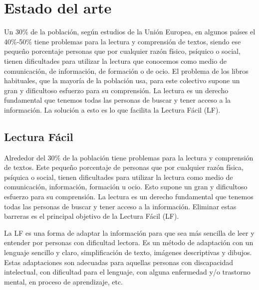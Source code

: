 \chapter{Estado del arte}
\label{cap:estadoDeLaCuestion}


Un 30\% de la población, según estudios de la Unión Europea, en algunos países el 40\%-50\% tiene problemas para la lectura y comprensión de textos, siendo ese pequeño porcentaje personas que por cualquier razón físico, psíquico o social, tienen dificultades para utilizar la lectura que conocemos como medio de comunicación, de información, de formación o de ocio. El problema de los libros habituales, que la mayoría de la población usa, para este colectivo supone un gran y dificultoso esfuerzo para su comprensión. La lectura es un derecho fundamental que tenemos todas las personas de buscar y tener acceso a la información. La solución a esto es lo que facilita la Lectura Fácil (LF).




\section{Lectura Fácil}
Alrededor del 30\% de la población tiene problemas para la lectura y comprensión de textos. Este pequeño porcentaje de personas que por cualquier razón física, psíquica o social, tienen dificultades para utilizar la lectura como medio de comunicación, información, formación u ocio. Esto supone un gran y dificultoso esfuerzo para su comprensión. La lectura es un derecho fundamental que tenemos todas las personas de buscar y tener acceso a la información. Eliminar estas barreras es el principal objetivo de la Lectura Fácil (LF).

La LF es una forma de adaptar la información para que sea más sencilla de leer y entender por personas con dificultad lectora. Es un método de adaptación con un lenguaje sencillo y claro, simplificación de texto, imágenes descriptivas y dibujos. Estas adaptaciones son adecuadas para aquellas personas con discapacidad intelectual, con dificultad para el lenguaje, con alguna enfermedad y/o trastorno mental, en proceso de aprendizaje, etc.

 \setlength{\parskip}{10pt}


